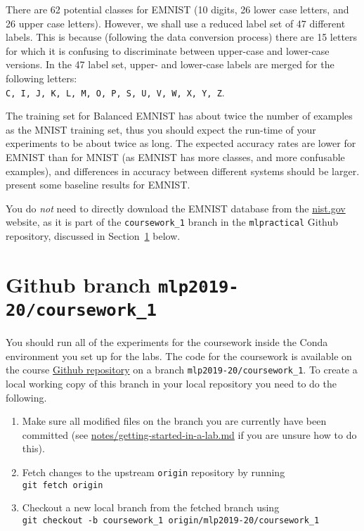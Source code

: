 \documentclass[11pt,]{article}
\begin{document}
There are 62 potential classes for EMNIST (10 digits, 26 lower case letters, and 26 upper case letters).  However, we shall use a reduced label set of 47 different labels.  This is because (following the data conversion process)  there are 15 letters for which it is confusing to discriminate between upper-case and lower-case versions.  In the 47 label set, upper- and lower-case labels are merged for the following letters:\\
\texttt{C, I, J, K, L, M, O, P, S, U, V, W, X, Y, Z}.  

The training set for Balanced EMNIST has about twice the number of examples as the MNIST training set, thus you should expect the run-time of your experiments to be about twice as long.  The expected accuracy rates are lower for EMNIST than for MNIST (as EMNIST has more classes, and more confusable examples), and differences in accuracy between different systems should be larger.   \citet{cohen2017emnist} present some baseline results for EMNIST.

You do \emph{not} need to directly download the EMNIST database from the \href{https://www.nist.gov/itl/iad/image-group/emnist-dataset}{nist.gov} website, as it is part of the \verb+coursework_1+ branch in the \verb+mlpractical+ Github repository,  discussed in Section~\ref{sec:code} below.



\newpage
\section{Github branch \texttt{mlp2019-20/coursework\_1}}
\label{sec:code}

You should run all of the experiments for the coursework inside the
Conda environment you set up for the labs.  The code for the coursework 
is available on the course
\href{https://github.com/CSTR-Edinburgh/mlpractical/}{Github repository}
on a branch \verb+mlp2019-20/coursework_1+. To create a local working
copy of this branch in your local repository you need to do the
following.

\begin{enumerate}
\def\labelenumi{\arabic{enumi}.}
\itemsep3pt\parskip0pt
\item
  Make sure all modified files on the branch you are currently have been
  committed
  (see \href{https://github.com/CSTR-Edinburgh/mlpractical/blob/mlp2019-20/master/notes/getting-started-in-a-lab.md}{notes/getting-started-in-a-lab.md} if you are unsure how to do this).
\item
  Fetch changes to the upstream \texttt{origin} repository by running\\
  \texttt{git fetch origin}
\item
  Checkout a new local branch from the fetched branch using\\
  \verb+git checkout -b coursework_1 origin/mlp2019-20/coursework_1+
\end{enumerate}
\end{document}
